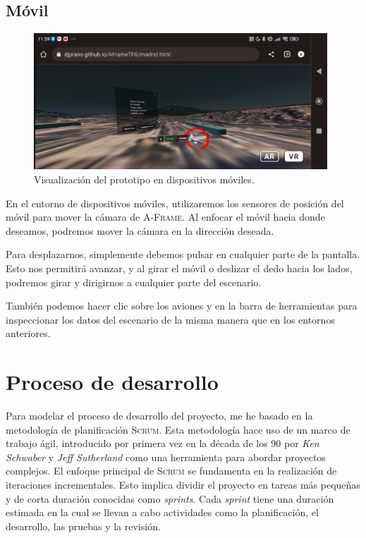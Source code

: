 \documentclass[a4paper, 11pt]{book}
\begin{document}
\subsection{Móvil}
\begin{figure}[h]
	\centering
	\includegraphics[width=11cm, keepaspectratio]{img/androidDemo.jpg}
	\caption{Visualización del prototipo en dispositivos móviles.}
	\label{fig:scrum}
\end{figure}
En el entorno de dispositivos móviles, utilizaremos los sensores de posición del móvil para mover la cámara de \textsc{A-Frame}. Al enfocar el móvil hacia donde deseamos, podremos mover la cámara en la dirección deseada.

Para desplazarnos, simplemente debemos pulsar en cualquier parte de la pantalla. Esto nos permitirá avanzar, y al girar el móvil o deslizar el dedo hacia los lados, podremos girar y dirigirnos a cualquier parte del escenario.

También podemos hacer clic sobre los aviones y en la barra de herramientas para inspeccionar los datos del escenario de la misma manera que en los entornos anteriores.

\section{Proceso de desarrollo}
Para modelar el proceso de desarrollo del proyecto, me he basado en la metodología de planificación \textsc{Scrum}.
Esta metodología hace uso de un marco de trabajo ágil, introducido por primera vez en la década de los 90 por \emph{Ken Schwaber} y \emph{Jeff Sutherland} como una herramienta para abordar proyectos complejos.
El enfoque principal de \textsc{Scrum} se fundamenta en la realización de iteraciones incrementales. Esto implica dividir el proyecto en tareas más pequeñas y de corta duración conocidas como \emph{sprints}. 
Cada \emph{sprint} tiene una duración estimada en la cual se llevan a cabo actividades como la planificación, el desarrollo, las pruebas y la revisión.
\end{document}

